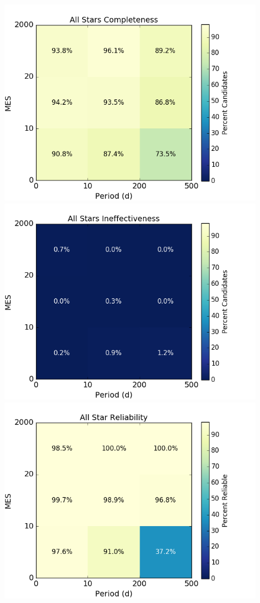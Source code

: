 \begin{figure}[h!]
\begin{center}
\includegraphics[width=0.9\linewidth]{fig-AllCompletePmes.png}
\includegraphics[width=0.9\linewidth]{fig-AllEffect-Pmes.png}
\includegraphics[width=0.9\linewidth]{fig-AllReliabilityPmes.png}

\end{center}
\end{figure}
